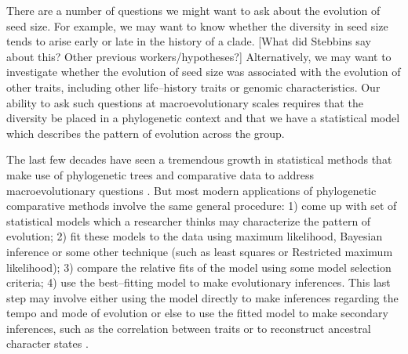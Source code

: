 \documentclass[12pt]{article}
\begin{document}
There are a number of questions we might want to ask about the evolution of seed size. For example, we may want to know whether the diversity in seed size tends to arise early or late in the history of a clade. [What did Stebbins say about this? Other previous workers/hypotheses?] Alternatively, we may want to investigate whether the evolution of seed size was associated with the evolution of other traits, including other life--history traits or genomic characteristics. Our ability to ask such questions at macroevolutionary scales requires that the diversity be placed in a phylogenetic context and that we have a statistical model which describes the pattern of evolution across the group. 

The last few decades have seen a tremendous growth in statistical methods that make use of phylogenetic trees and comparative data to address macroevolutionary questions \citep[for recent reviews][]{Omeara2012, PennellHarmon}. But most modern applications of phylogenetic comparative methods involve the same general procedure: 1) come up with set of statistical models which a researcher thinks may characterize the pattern of evolution; 2) fit these models to the data using maximum likelihood, Bayesian inference or some other technique (such as least squares or Restricted maximum likelihood); 3) compare the relative fits of the model using some model selection criteria; 4) use the best--fitting model to make evolutionary inferences. This last step may involve either using the model directly to make inferences regarding the tempo and mode of evolution \citep[e.g.][]{HansenMartins1996, Mooers1999, Harmon2010, Hunt2012} or else to use the fitted model to make secondary inferences, such as the correlation between traits \citep[e.g.][]{Felsenstein1985, Grafen1989, Freckleton2009} or to reconstruct ancestral character states \citep[e.g.][]{Schluter1997}. 
\end{document}
